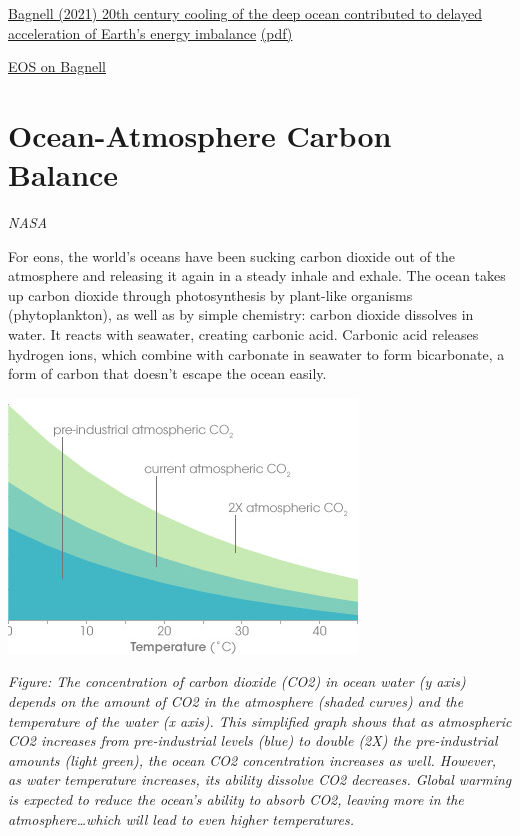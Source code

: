 \documentclass[
]{book}
\begin{document}
\href{https://www.nature.com/articles/s41467-021-24472-3}{Bagnell (2021) 20th century cooling of the deep ocean contributed to delayed acceleration of Earth's energy imbalance}
\href{pdf/Bagnell_2021_Deep_Ocean_Cooling.pdf}{(pdf)}

\href{https://eos.org/articles/deep-ocean-cooling-may-have-offset-global-warming-until-1990}{EOS on Bagnell}

\hypertarget{ocean-atmosphere-carbon-balance}{%
\section{Ocean-Atmosphere Carbon Balance}\label{ocean-atmosphere-carbon-balance}}

\emph{NASA}

For eons, the world's oceans have been sucking carbon dioxide out of the atmosphere and releasing it again in a steady inhale and exhale. The ocean takes up carbon dioxide through photosynthesis by plant-like organisms (phytoplankton), as well as by simple chemistry: carbon dioxide dissolves in water. It reacts with seawater, creating carbonic acid. Carbonic acid releases hydrogen ions, which combine with carbonate in seawater to form bicarbonate, a form of carbon that doesn't escape the ocean easily.

\includegraphics{fig/ocean_carbon_uptake.jpg}

\emph{Figure: The concentration of carbon dioxide (CO2) in ocean water (y axis) depends on the amount of CO2 in the atmosphere (shaded curves) and the temperature of the water (x axis). This simplified graph shows that as atmospheric CO2 increases from pre-industrial levels (blue) to double (2X) the pre-industrial amounts (light green), the ocean CO2 concentration increases as well. However, as water temperature increases, its ability dissolve CO2 decreases. Global warming is expected to reduce the ocean's ability to absorb CO2, leaving more in the atmosphere\ldots which will lead to even higher temperatures.}
\end{document}
